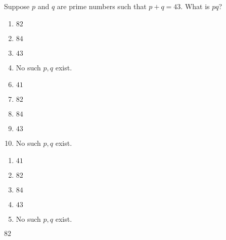 

   Suppose $p$ and $q$ are prime numbers such that $p+q=43$.  What is $pq$?  



\ifsat
	\begin{enumerate}[label=\Alph*)]
		\item  $82$%
		\item $84$
		\item $43$
		\item  No such $p,q$ exist.
	\end{enumerate}
\else
\fi

\ifacteven
	\begin{enumerate}[label=\textbf{\Alph*.},itemsep=\fill,align=left]
		\setcounter{enumii}{5}
		\item   $41$
		\item  $82$%
		\item $84$
		\addtocounter{enumii}{1}
		\item $43$
		\item  No such $p,q$ exist.
	\end{enumerate}
\else
\fi

\ifactodd
	\begin{enumerate}[label=\textbf{\Alph*.},itemsep=\fill,align=left]
		\item   $41$
		\item  $82$%
		\item $84$
		\item $43$
		\item  No such $p,q$ exist.
	\end{enumerate}
\else
\fi

\ifgridin
  $82$%
		
\else
\fi

